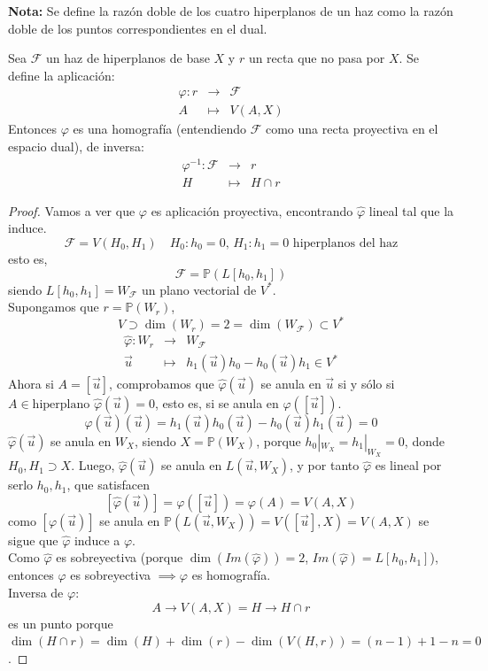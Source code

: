 \textbf{Nota:} Se define la razón doble de los cuatro hiperplanos de un haz como la razón doble de los puntos correspondientes en el dual.

\begin{proposición}
    Sea $\mathcal{F}$ un haz de hiperplanos de base $X$ y $r$ un recta que no pasa por $X$. Se define la aplicación:
    \[
        \begin{matrix}
            \varphi : r & \to & \mathcal{F} \\
            A & \mapsto & V(A,X)
        \end{matrix}
    \]
    Entonces $\varphi$ es una homografía (entendiendo $\mathcal{F}$ como una recta proyectiva en el espacio dual), de inversa:
    \[
        \begin{matrix}
            \varphi^{-1} : \mathcal{F} & \to & r \\
            H & \mapsto & H \cap r
        \end{matrix}
    \]
\end{proposición}

\begin{proof}
    Vamos a ver que $\varphi$ es aplicación proyectiva, encontrando $\hat{\varphi}$ lineal tal que la induce.
    \[
        \mathcal{F} = V(H_0,H_1) \quad H_0 : h_0 = 0, \, H_1 : h_1 = 0 \text{ hiperplanos del haz}
    \]
    esto es,
    \[
        \mathcal{F} = \mathbb{P}(L[h_0, h_1]) 
    \]
    siendo $L[h_0, h_1] = W_\mathcal{F}$ un plano vectorial de $V^*$.\\
    Supongamos que $r = \mathbb{P}(W_r)$, 
    \[
        V \supset \dim(W_r) = 2 = \dim(W_\mathcal{F}) \subset V^*
    \]
    \[
        \begin{matrix}
            \hat{\varphi} : W_r & \to & W_\mathcal{F} \\
            \vec{u} & \mapsto & h_1(\vec{u}) h_0 - h_0(\vec{u}) h_1 \in V^*
        \end{matrix}
    \]
    Ahora si $A = [\vec{u}]$, comprobamos que $\hat{\varphi}(\vec{u})$ se anula en $\vec{u}$ si y sólo si $A \in \text{hiperplano } \hat{\varphi}(\vec{u}) = 0$, esto es, si se anula en $\varphi([\vec{u}])$.
    \[
        \hat{\varphi}(\vec{u})(\vec{u}) =
        h_1(\vec{u}) h_0(\vec{u}) - h_0(\vec{u}) h_1(\vec{u}) = 0
    \]
    $\hat{\varphi}(\vec{u})$ se anula en $W_X$, siendo $X = \mathbb{P}(W_X)$, porque $h_0 |_{W_X} = h_1 |_{W_X} = 0$, donde $H_0, H_1 \supset X$. Luego, $\hat{\varphi}(\vec{u})$ se anula en $L(\vec{u}, W_X)$, y por tanto $\hat{\varphi}$ es lineal por serlo $h_0, h_1$, que satisfacen
    \[
        [\hat{\varphi}(\vec{u})] = \varphi([\vec{u}]) = \varphi(A) = V(A,X)
    \]
    como $[\varphi(\vec{u})]$ se anula en $\mathbb{P}(L(\vec{u}, W_X)) = V([\vec{u}], X) = V(A,X)$ se sigue que $\hat{\varphi}$ induce a $\varphi$.\\
    Como $\hat{\varphi}$ es sobreyectiva (porque $\dim(Im(\hat{\varphi})) = 2$, $Im(\hat{\varphi}) = L[h_0, h_1]$), entonces $\varphi$ es sobreyectiva $\implies \varphi$ es homografía.\\
    Inversa de $\varphi$:
    \[
        A \to V(A,X) = H  \to H \cap r
    \]
    es un punto porque $\dim(H \cap r) = \dim(H) + \dim(r) - \dim(V(H,r)) = (n-1) + 1 - n = 0$.
\end{proof}


